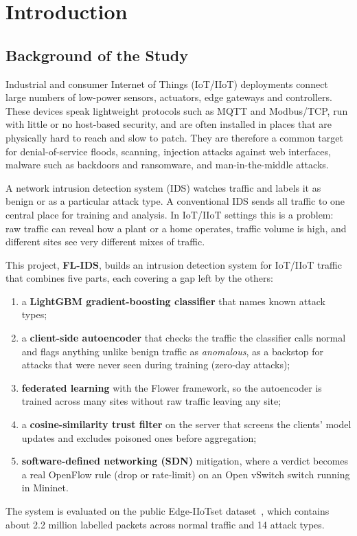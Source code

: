 \chapter{Introduction}

\section{Background of the Study}
Industrial and consumer Internet of Things (IoT/IIoT) deployments connect large numbers of low-power sensors, actuators, edge gateways and controllers. These devices speak lightweight protocols such as MQTT and Modbus/TCP, run with little or no host-based security, and are often installed in places that are physically hard to reach and slow to patch. They are therefore a common target for denial-of-service floods, scanning, injection attacks against web interfaces, malware such as backdoors and ransomware, and man-in-the-middle attacks.

A network intrusion detection system (IDS) watches traffic and labels it as benign or as a particular attack type. A conventional IDS sends all traffic to one central place for training and analysis. In IoT/IIoT settings this is a problem: raw traffic can reveal how a plant or a home operates, traffic volume is high, and different sites see very different mixes of traffic.

This project, \textbf{FL-IDS}, builds an intrusion detection system for IoT/IIoT traffic that combines five parts, each covering a gap left by the others:
\begin{enumerate}
  \item a \textbf{LightGBM gradient-boosting classifier} that names known attack types;
  \item a \textbf{client-side autoencoder} that checks the traffic the classifier calls normal and flags anything unlike benign traffic as \emph{anomalous}, as a backstop for attacks that were never seen during training (zero-day attacks);
  \item \textbf{federated learning} with the Flower framework, so the autoencoder is trained across many sites without raw traffic leaving any site;
  \item a \textbf{cosine-similarity trust filter} on the server that screens the clients' model updates and excludes poisoned ones before aggregation;
  \item \textbf{software-defined networking (SDN)} mitigation, where a verdict becomes a real OpenFlow rule (drop or rate-limit) on an Open vSwitch switch running in Mininet.
\end{enumerate}
The system is evaluated on the public Edge-IIoTset dataset~\cite{ferrag2022edge}, which contains about 2.2 million labelled packets across normal traffic and 14 attack types.

